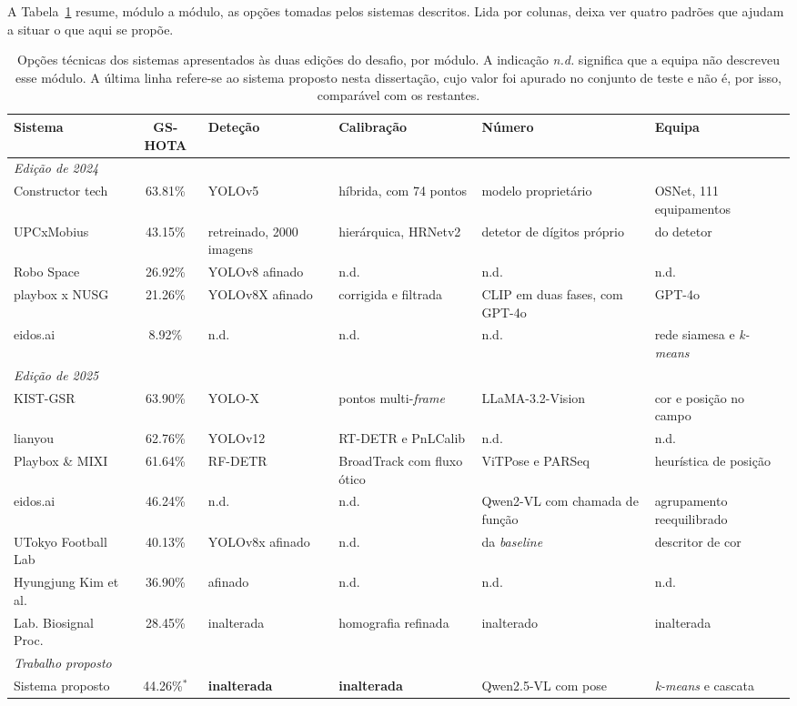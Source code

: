 A Tabela~\ref{tab:sistemas_gsr} resume, módulo a módulo, as opções tomadas pelos sistemas
descritos. Lida por colunas, deixa ver quatro padrões que ajudam a situar o que aqui se
propõe.

\begin{table}[htbp]
\centering
\caption{Opções técnicas dos sistemas apresentados às duas edições do desafio, por módulo.
A indicação \emph{n.d.} significa que a equipa não descreveu esse módulo. A última linha
refere-se ao sistema proposto nesta dissertação, cujo valor foi apurado no conjunto de
teste e não é, por isso, comparável com os restantes.}
\label{tab:sistemas_gsr}
\footnotesize
\setlength{\tabcolsep}{4pt}
\renewcommand{\arraystretch}{1.25}
\begin{tabular}{|p{2.3cm}|c|p{2.1cm}|p{2.3cm}|p{2.6cm}|p{2.3cm}|}
\hline
\textbf{Sistema} & \textbf{GS-HOTA} & \textbf{Deteção} & \textbf{Calibração} &
\textbf{Número} & \textbf{Equipa} \\
\hline
\multicolumn{6}{|l|}{\textit{Edição de 2024}} \\
\hline
Constructor tech & 63.81\% & YOLOv5 & híbrida, com 74 pontos & modelo proprietário &
OSNet, 111 equipamentos \\
\hline
UPCxMobius & 43.15\% & retreinado, 2000 imagens & hierárquica, HRNetv2 & detetor de
dígitos próprio & do detetor \\
\hline
Robo Space & 26.92\% & YOLOv8 afinado & n.d. & n.d. & n.d. \\
\hline
playbox x NUSG & 21.26\% & YOLOv8X afinado & corrigida e filtrada & CLIP em duas fases,
com GPT-4o & GPT-4o \\
\hline
eidos.ai & 8.92\% & n.d. & n.d. & n.d. & rede siamesa e \emph{k-means} \\
\hline
\multicolumn{6}{|l|}{\textit{Edição de 2025}} \\
\hline
KIST-GSR & 63.90\% & YOLO-X & pontos multi-\emph{frame} & LLaMA-3.2-Vision & cor e posição
no campo \\
\hline
lianyou & 62.76\% & YOLOv12 & RT-DETR e PnLCalib & n.d. & n.d. \\
\hline
Playbox \& MIXI & 61.64\% & RF-DETR & BroadTrack com fluxo ótico & ViTPose e PARSeq &
heurística de posição \\
\hline
eidos.ai & 46.24\% & n.d. & n.d. & Qwen2-VL com chamada de função & agrupamento
reequilibrado \\
\hline
UTokyo Football Lab & 40.13\% & YOLOv8x afinado & n.d. & da \emph{baseline} & descritor de
cor \\
\hline
Hyungjung Kim et al. & 36.90\% & afinado & n.d. & n.d. & n.d. \\
\hline
Lab. Biosignal Proc. & 28.45\% & inalterada & homografia refinada & inalterado &
inalterada \\
\hline
\multicolumn{6}{|l|}{\textit{Trabalho proposto}} \\
\hline
Sistema proposto & 44.26\%$^{*}$ & \textbf{inalterada} & \textbf{inalterada} &
Qwen2.5-VL com pose & \emph{k-means} e cascata \\
\hline
\end{tabular}


\end{table}
